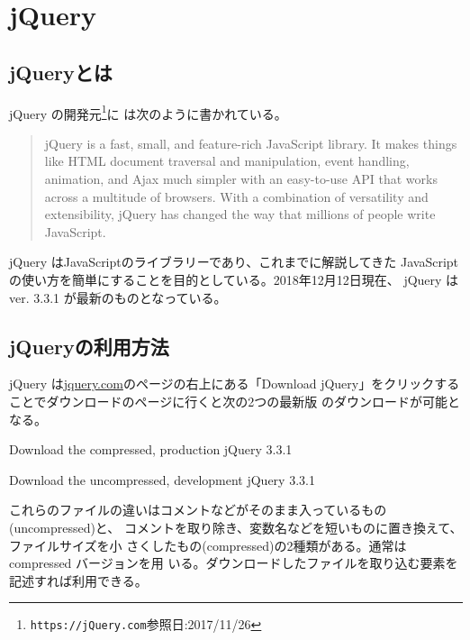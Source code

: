 \chapter{jQuery}
\section{jQueryとは}
jQuery の開発元\footnote{\texttt{https://jQuery.com}参照日:2017/11/26}に
は次のように書かれている。
\begin{quotation}
jQuery is a fast, small, and feature-rich JavaScript library. It makes
 things like HTML document traversal and manipulation, event handling,
 animation, and Ajax much simpler with an easy-to-use API that works
 across a multitude of browsers. With a combination of versatility and
 extensibility, jQuery has changed the way that millions of people write
 JavaScript.
 \end{quotation}
jQuery はJavaScriptのライブラリーであり、これまでに解説してきた
JavaScriptの使い方を簡単にすることを目的としている。2018年12月12日現在、
jQuery は ver. 3.3.1 が最新のものとなっている。

\section{jQueryの利用方法}
jQuery は\href{jquery.com}{jquery.com}のページの右上にある「Download
jQuery」をクリックすることでダウンロードのページに行くと次の2つの最新版
のダウンロードが可能となる。

Download the compressed, production jQuery 3.3.1

Download the uncompressed, development jQuery 3.3.1

これらのファイルの違いはコメントなどがそのまま入っているもの(uncompressed)と、
コメントを取り除き、変数名などを短いものに置き換えて、ファイルサイズを小
さくしたもの(compressed)の2種類がある。通常は compressed バージョンを用
いる。ダウンロードしたファイルを取り込む要素を記述すれば利用できる。

